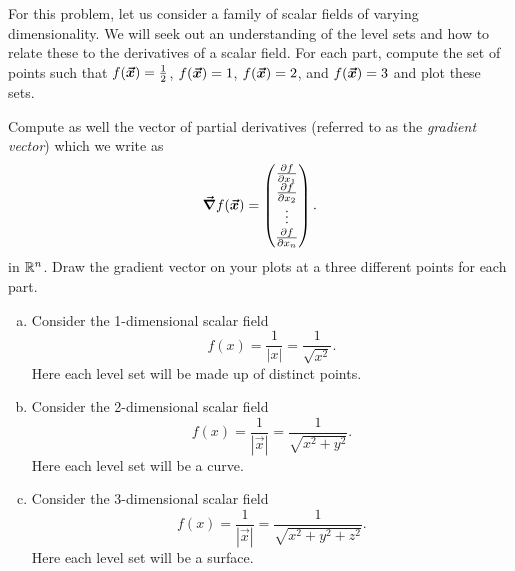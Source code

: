 \documentclass[12pt]{article} %
\begin{document}
\newpage
\begin{problem}
For this problem, let us consider a family of scalar fields of varying dimensionality.  We will seek out an understanding of the level sets and how to relate these to the derivatives of a scalar field. For each part, compute the set of points such that $f(\boldsymbol{\vec{x}})=\frac{1}{2}$, $f(\boldsymbol{\vec{x}})=1$, $f(\boldsymbol{\vec{x}})=2$, and $f(\boldsymbol{\vec{x}})=3$ and plot these sets. 

Compute as well the vector of partial derivatives (referred to as the \emph{gradient vector}) which we write as
\[
\boldsymbol{\vec{\nabla}} f(\boldsymbol{\vec{x}}) = \begin{pmatrix} \frac{\partial f}{\partial x_1} \\ \frac{\partial f}{\partial x_2} \\ \vdots \\ \frac{\partial f}{\partial x_n}\end{pmatrix}.
\]
in $\mathbb{R}^n$. Draw the gradient vector on your plots at a three different points for each part.
\begin{enumerate}[(a)]
	\item Consider the 1-dimensional scalar field 
	\[
	f(x) = \frac{1}{|x|}=\frac{1}{\sqrt{x^2}}.
	\]
	Here each level set will be made up of distinct points.
	\item Consider the 2-dimensional scalar field
	\[
	f(x) = \frac{1}{|\vec{x}|} = \frac{1}{\sqrt{x^2+y^2}}.
	\]
	Here each level set will be a curve.
	\item Consider the 3-dimensional scalar field
		\[
		f(x) = \frac{1}{|\vec{x}|} = \frac{1}{\sqrt{x^2+y^2+z^2}}.
		\]
		Here each level set will be a surface.
\end{enumerate}
\end{problem}
\end{document}
